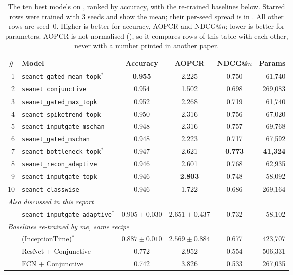 \begin{table}[tbp]
\caption{The ten best models on \webtraffic{}, ranked by accuracy, with the re-trained baselines
below. Starred rows were trained with 3 seeds and show the mean; their per-seed spread is in
. All other rows are seed~0. Higher is better for accuracy, AOPCR and NDCG@$n$;
lower is better for parameters. AOPCR is not normalised (), so it compares rows
of this table with each other, never with a number printed in another paper.}
\label{tab:web_main}
\begin{center}
\footnotesize
\setlength{\tabcolsep}{4pt}
\begin{tabular}{rlcccr}
\toprule
\textbf{\#} & \textbf{Model} & \textbf{Accuracy} & \textbf{AOPCR} & \textbf{NDCG@$n$} &
\textbf{Params} \\
\midrule
1  & \texttt{seanet\_gated\_mean\_topk}$^\ast$ & \textbf{0.955} & 2.225 & 0.750 & 61{,}740 \\
2  & \texttt{seanet\_conjunctive}              & 0.954 & 1.502 & 0.698 & 269{,}083 \\
3  & \texttt{seanet\_gated\_max\_topk}         & 0.952 & 2.268 & 0.719 & 61{,}740 \\
4  & \texttt{seanet\_spiketrend\_topk}         & 0.950 & 2.316 & 0.756 & 67{,}020 \\
5  & \texttt{seanet\_inputgate\_mschan}        & 0.948 & 2.316 & 0.757 & 69{,}768 \\
6  & \texttt{seanet\_gated\_mschan}            & 0.948 & 2.223 & 0.717 & 67{,}592 \\
7  & \texttt{seanet\_bottleneck\_topk}$^\ast$  & 0.947 & 2.621 & \textbf{0.773} & \textbf{41{,}324} \\
8  & \texttt{seanet\_recon\_adaptive}          & 0.946 & 2.601 & 0.768 & 62{,}935 \\
9  & \texttt{seanet\_inputgate\_topk}          & 0.946 & \textbf{2.803} & 0.748 & 58{,}092 \\
10 & \texttt{seanet\_classwise}                & 0.946 & 1.722 & 0.686 & 269{,}164 \\
\midrule
\multicolumn{6}{l}{\emph{Also discussed in this report}}\\
   & \texttt{seanet\_inputgate\_adaptive}$^\ast$ & $0.905\pm0.030$ & $2.651\pm0.437$ & 0.732 & 58{,}102 \\
\midrule
\multicolumn{6}{l}{\emph{Baselines re-trained by me, same recipe}}\\
   & \millet{} (InceptionTime)$^\ast$        & $0.887\pm0.010$ & $2.569\pm0.884$ & 0.677 & 423{,}707 \\
   & ResNet + Conjunctive                    & 0.772 & 2.952 & 0.554 & 506{,}331 \\
   & FCN + Conjunctive                       & 0.742 & 3.826 & 0.533 & 267{,}035 \\
\bottomrule
\end{tabular}
\end{center}
\end{table}
